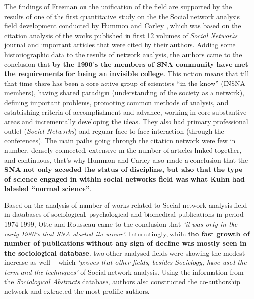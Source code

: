 \documentclass[11pt]{article} %
\begin{document}
The findings of Freeman on the unification of the field are supported by the results of one of the first quantitative study on the the Social network analysis field development conducted by Hummon and Carley \citep{normSci}, which was based on the citation analysis of the works published in first 12 volumes of  \textit{Social Networks} journal and important articles that were cited by their authors. Adding some historiographic data to the results of  network analysis, the authors came to the conclusion that \textbf{by the 1990`s the members of SNA community have met the requirements for being an invisible college}. This notion means that till that time there has been a core active group of scientists “in the know” (INSNA members), having shared paradigm (understanding of the society as a network), defining important problems, promoting common methods of analysis, and establishing criteria of accomplishment and advance, working in core substantive areas and incrementally developing the ideas. They also had primary professional outlet (\textit{Social Networks}) and regular face-to-face interaction (through the conferences). The main paths going through the citation network were few in number, densely connected, extensive in the number of articles linked together, and continuous, that’s why Hummon and Carley also made a conclusion that the \textbf{SNA not only acceded the status of discipline, but also that the type of science engaged in within social networks field was what Kuhn had labeled “normal science”}.\medskip 

Based on the analysis of number of works related to Social network analysis field in databases of sociological, psychological and biomedical publications in period 1974-1999, Otte and Rousseau \citep{SNAinf} came to the conclusion that \textit{`it was only in the early 1980`s that SNA started its career'}. Interestingly, while \textbf{the fast growth of number of publications without any sign of decline was mostly seen in the sociological database}, two other analysed fields were showing the modest increase as well -- which \textit{`proves that other fields, besides Sociology, have used the term and the techniques'} of Social network analysis. Using the information from the \textit{Sociological Abstracts} database, authors also constructed the co-authorship network and extracted the most prolific authors.\medskip 
\end{document}

